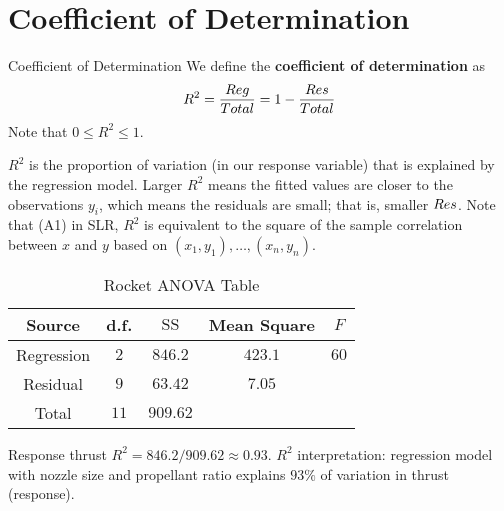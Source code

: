 \section{Coefficient of Determination}
\begin{Definition}{Coefficient of Determination}{}
    We define the \textbf{coefficient of determination} as
    \[ R^2 = \frac{\relax{Reg}}{\relax{Total}} =1-\frac{\relax{Res}}{\relax{Total}} \]
    Note that $ 0\leqslant R^2\leqslant 1 $.
\end{Definition}
$ R^2 $ is the proportion of variation (in our response variable)
that is explained by the regression model. Larger $ R^2 $ means
the fitted values are closer to the observations $ y_i $,
which means the residuals are small; that is, smaller $ \relax{Res} $.
Note that (A1) in SLR, $ R^2 $ is equivalent to the square of
the sample correlation between $ x $ and $ y $
based on $ (x_1,y_1),\ldots,(x_n,y_n) $.

\begin{table}[H]
    \centering
    \caption{Rocket ANOVA Table}
    \begin{NiceTabular}{|c|c|c|c|c|}
        \toprule
        Source     & d.f.   & $ \text{SS} $     & Mean Square & $ F $  \\
        \midrule
        Regression & $ 2 $  & $ 846.2 $  & $ 423.1 $   & $ 60 $ \\
        Residual   & $ 9 $  & $ 63.42 $  & $ 7.05 $    &        \\
        \midrule
        Total      & $ 11 $ & $ 909.62 $                        \\
        \bottomrule
    \end{NiceTabular}
\end{table}
Response thrust
$ R^2=846.2/909.62 \approx 0.93 $. $ R^2 $
interpretation: regression model with nozzle size and propellant ratio
explains $ 93\% $ of variation in thrust (response).
